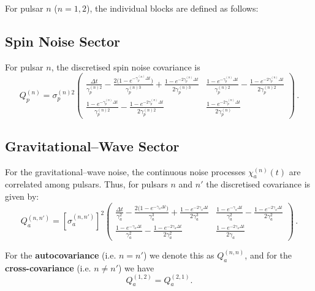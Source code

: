 \documentclass[]{scrartcl}
\begin{document}
	For pulsar \(n\) (\(n=1,2\)), the individual blocks are defined as follows:
	
	\subsection*{Spin Noise Sector}
	
	For pulsar \(n\), the discretised spin noise covariance is
	\begin{equation}
		Q_p^{(n)} = \sigma_p^{(n)2}
		\begin{pmatrix}
			\displaystyle \frac{\Delta t}{\gamma_p^{(n)2}} - \frac{2\bigl(1-e^{-\gamma_p^{(n)}\Delta t}\bigr)}{\gamma_p^{(n)3}} + \frac{1-e^{-2\gamma_p^{(n)}\Delta t}}{2\gamma_p^{(n)3}} 
			& \displaystyle \frac{1-e^{-\gamma_p^{(n)}\Delta t}}{\gamma_p^{(n)2}} - \frac{1-e^{-2\gamma_p^{(n)}\Delta t}}{2\gamma_p^{(n)2}} \\[2mm]
			\displaystyle \frac{1-e^{-\gamma_p^{(n)}\Delta t}}{\gamma_p^{(n)2}} - \frac{1-e^{-2\gamma_p^{(n)}\Delta t}}{2\gamma_p^{(n)2}} 
			& \displaystyle \frac{1-e^{-2\gamma_p^{(n)}\Delta t}}{2\gamma_p^{(n)}}
		\end{pmatrix}\,.
	\end{equation}
	
	\subsection*{Gravitational--Wave Sector}
	
	For the gravitational--wave noise, the continuous noise processes \(\chi_a^{(n)}(t)\) are correlated among pulsars. Thus, for pulsars \(n\) and \(n'\) the discretised covariance is given by:
	\begin{equation}
		Q_a^{(n,n')} = \left[\sigma_a^{(n,n')}\right]^2
		\begin{pmatrix}
			\displaystyle \frac{\Delta t}{\gamma_a^2} - \frac{2\bigl(1-e^{-\gamma_a\Delta t}\bigr)}{\gamma_a^3} + \frac{1-e^{-2\gamma_a\Delta t}}{2\gamma_a^3} 
			& \displaystyle \frac{1-e^{-\gamma_a\Delta t}}{\gamma_a^2} - \frac{1-e^{-2\gamma_a\Delta t}}{2\gamma_a^2} \\[2mm]
			\displaystyle \frac{1-e^{-\gamma_a\Delta t}}{\gamma_a^2} - \frac{1-e^{-2\gamma_a\Delta t}}{2\gamma_a^2} 
			& \displaystyle \frac{1-e^{-2\gamma_a\Delta t}}{2\gamma_a}
		\end{pmatrix}\,.
	\end{equation}
	
	For the \textbf{autocovariance} (i.e. \(n=n'\)) we denote this as \(Q_a^{(n,n)}\), and for the \textbf{cross-covariance} (i.e. \(n \neq n'\)) we have
	\[
	Q_a^{(1,2)} = Q_a^{(2,1)}.
	\]
	
\end{document}
